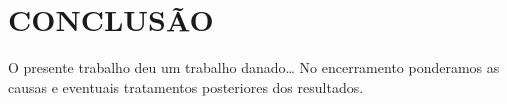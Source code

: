 \chapter*{CONCLUSÃO}\label{chap:conclusao}

O presente trabalho deu um trabalho danado\ldots
No encerramento ponderamos as causas e eventuais tratamentos posteriores dos resultados.
